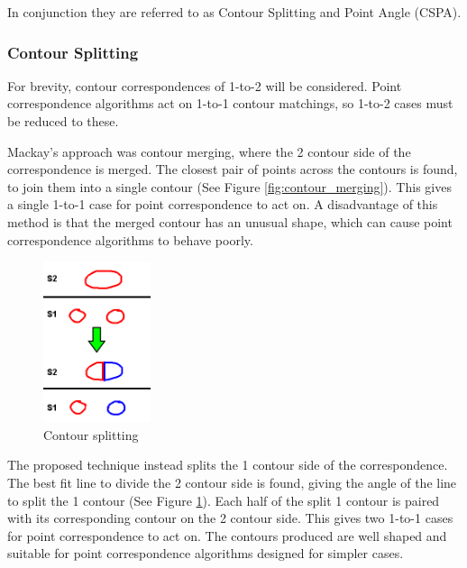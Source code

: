 \documentclass[11p, titlepage]{article}
\begin{document}
In conjunction they are referred to as Contour Splitting and Point Angle (CSPA).

\subsubsection{Contour Splitting}

For brevity, contour correspondences of 1-to-2 will be considered. Point correspondence algorithms act on 1-to-1 contour matchings, so 1-to-2 cases must be reduced to these. 

Mackay's approach was contour merging, where the 2 contour side of the correspondence is merged. The closest pair of points across the contours is found, to join them into a single contour (See Figure \ref{fig:contour_merging}). This gives a single 1-to-1 case for point correspondence to act on. A disadvantage of this method is that the merged contour has an unusual shape, which can cause point correspondence algorithms to behave poorly.

\begin{figure}[h!]
\centering
\includegraphics[width=0.28\textwidth]{diagrams/contour_splitting}
\caption{Contour splitting \label{fig:contour_splitting}}
\end{figure}

The proposed technique instead splits the 1 contour side of the correspondence. The best fit line to divide the 2 contour side is found, giving the angle of the line to split the 1 contour (See Figure \ref{fig:contour_splitting}). Each half of the split 1 contour is paired with its corresponding contour on the 2 contour side. This gives two 1-to-1 cases for point correspondence to act on. The contours produced are well shaped and suitable for point correspondence algorithms designed for simpler cases.
\end{document}
